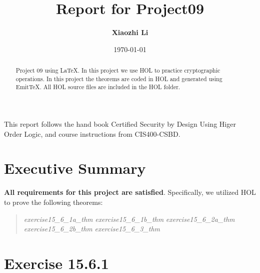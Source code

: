 \documentclass{report}
\title{Report for Project09}
\author{\textbf{Xiaozhi Li}}
\date{\today}
\begin{document}
\lstset{language=ML}


\maketitle{}

\begin{abstract}
  Project 09 using \LaTeX{}. In this project we use HOL to practice cryptographic operations.
  In this project the theorems are coded in HOL and generated using EmitTeX. All HOL source files are included in the HOL folder.
 \end{abstract}

\begin{acknowledgments}
 This report follows the hand book Certified Security by Design Using Higer Order Logic, and course instructions from CIS400-CSBD.
 \end{acknowledgments}


\tableofcontents{}

\chapter{Executive Summary}


\textbf{All requirements for this project are satisfied}.
Specifically, we utilized HOL to prove the following theorems:
\begin{quote}
  \emph{exercise15_6_1a_thm}\HOLcryptoExercisesTheoremsexerciseOneFiveXXSixXXOneaXXthm
  \emph{exercise15_6_1b_thm}\HOLcryptoExercisesTheoremsexerciseOneFiveXXSixXXOnebXXthm
  \emph{exercise15_6_2a_thm}\HOLcryptoExercisesTheoremsexerciseOneFiveXXSixXXTwoaXXthm
  \emph{exercise15_6_2b_thm}\HOLcryptoExercisesTheoremsexerciseOneFiveXXSixXXTwobXXthm
  \emph{exercise15_6_3_thm}\HOLcryptoExercisesTheoremsexerciseOneFiveXXSixXXThreeXXthm
  \end{quote}



\chapter{Exercise 15.6.1}
\label{1561a}
\end{document}
